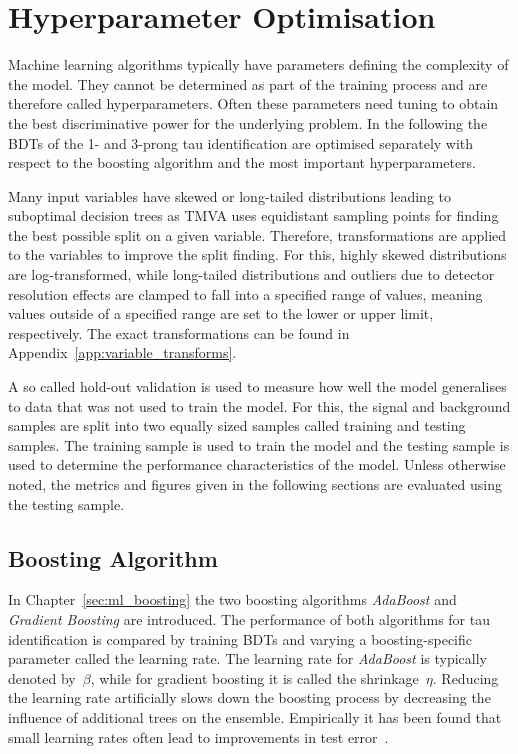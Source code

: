 

\section{Hyperparameter Optimisation}
\label{sec:bdt_hyperparam}

Machine learning algorithms typically have parameters defining the complexity of
the model. They cannot be determined as part of the training process and are
therefore called hyperparameters. Often these parameters need tuning to obtain
the best discriminative power for the underlying problem. In the following the
BDTs of the 1- and 3-prong tau identification are optimised separately with
respect to the boosting algorithm and the most important hyperparameters.

Many input variables have skewed or long-tailed distributions leading to
suboptimal decision trees as TMVA uses equidistant sampling points for finding
the best possible split on a given variable. Therefore, transformations are
applied to the variables to improve the split finding. For this, highly skewed
distributions are log-transformed, while long-tailed distributions and outliers
due to detector resolution effects are clamped to fall into a specified range of
values, meaning values outside of a specified range are set to the lower or
upper limit, respectively. The exact transformations can be found in
Appendix~\ref{app:variable_transforms}.

A so called hold-out validation is used to measure how well the model
generalises to data that was not used to train the model. For this, the signal
and background samples are split into two equally sized samples called training
and testing samples. The training sample is used to train the model and the
testing sample is used to determine the performance characteristics of the
model. Unless otherwise noted, the metrics and figures given in the following
sections are evaluated using the testing sample.

\subsection{Boosting Algorithm}
\label{sec:bdt_boosting}

In Chapter~\ref{sec:ml_boosting} the two boosting algorithms \emph{AdaBoost} and
\emph{Gradient Boosting} are introduced. The performance of both algorithms for
tau identification is compared by training BDTs and varying a boosting-specific
parameter called the learning rate. The learning rate for \emph{AdaBoost} is
typically denoted by~$\beta$, while for gradient boosting it is called the
shrinkage~$\eta$. Reducing the learning rate artificially slows down the
boosting process by decreasing the influence of additional trees on the
ensemble. Empirically it has been found that small learning rates often lead to
improvements in test error~\cite{esl}.

